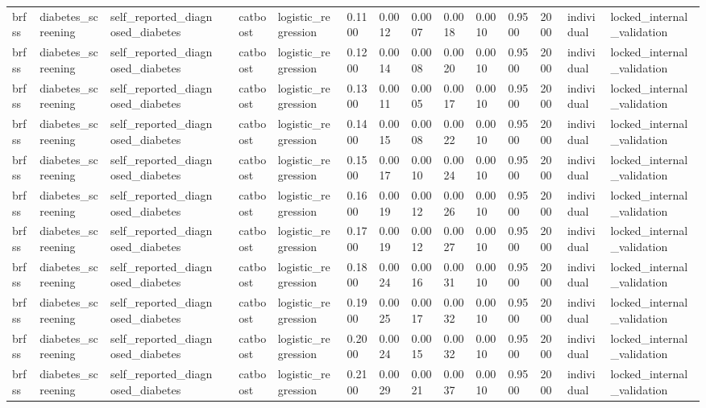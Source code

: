 \begin{tabular}{lllllllllllllll}
brfss & diabetes\_screening & self\_reported\_diagnosed\_diabetes &  & catboost & logistic\_regression & 0.1100 & 0.0012 & 0.0007 & 0.0018 & 0.0010 & 0.9500 & 2000 & individual & locked\_internal\_validation \\
brfss & diabetes\_screening & self\_reported\_diagnosed\_diabetes &  & catboost & logistic\_regression & 0.1200 & 0.0014 & 0.0008 & 0.0020 & 0.0010 & 0.9500 & 2000 & individual & locked\_internal\_validation \\
brfss & diabetes\_screening & self\_reported\_diagnosed\_diabetes &  & catboost & logistic\_regression & 0.1300 & 0.0011 & 0.0005 & 0.0017 & 0.0010 & 0.9500 & 2000 & individual & locked\_internal\_validation \\
brfss & diabetes\_screening & self\_reported\_diagnosed\_diabetes &  & catboost & logistic\_regression & 0.1400 & 0.0015 & 0.0008 & 0.0022 & 0.0010 & 0.9500 & 2000 & individual & locked\_internal\_validation \\
brfss & diabetes\_screening & self\_reported\_diagnosed\_diabetes &  & catboost & logistic\_regression & 0.1500 & 0.0017 & 0.0010 & 0.0024 & 0.0010 & 0.9500 & 2000 & individual & locked\_internal\_validation \\
brfss & diabetes\_screening & self\_reported\_diagnosed\_diabetes &  & catboost & logistic\_regression & 0.1600 & 0.0019 & 0.0012 & 0.0026 & 0.0010 & 0.9500 & 2000 & individual & locked\_internal\_validation \\
brfss & diabetes\_screening & self\_reported\_diagnosed\_diabetes &  & catboost & logistic\_regression & 0.1700 & 0.0019 & 0.0012 & 0.0027 & 0.0010 & 0.9500 & 2000 & individual & locked\_internal\_validation \\
brfss & diabetes\_screening & self\_reported\_diagnosed\_diabetes &  & catboost & logistic\_regression & 0.1800 & 0.0024 & 0.0016 & 0.0031 & 0.0010 & 0.9500 & 2000 & individual & locked\_internal\_validation \\
brfss & diabetes\_screening & self\_reported\_diagnosed\_diabetes &  & catboost & logistic\_regression & 0.1900 & 0.0025 & 0.0017 & 0.0032 & 0.0010 & 0.9500 & 2000 & individual & locked\_internal\_validation \\
brfss & diabetes\_screening & self\_reported\_diagnosed\_diabetes &  & catboost & logistic\_regression & 0.2000 & 0.0024 & 0.0015 & 0.0032 & 0.0010 & 0.9500 & 2000 & individual & locked\_internal\_validation \\
brfss & diabetes\_screening & self\_reported\_diagnosed\_diabetes &  & catboost & logistic\_regression & 0.2100 & 0.0029 & 0.0021 & 0.0037 & 0.0010 & 0.9500 & 2000 & individual & locked\_internal\_validation \\

\end{tabular}
